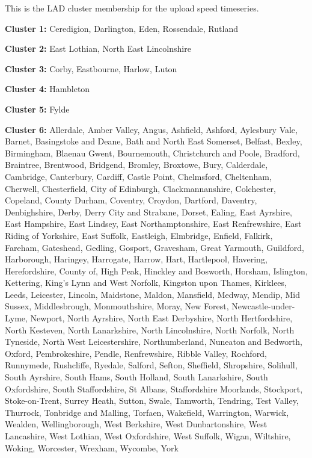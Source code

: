 \documentclass[Royal,times,sageh]{sagej}
\begin{document}
This is the LAD cluster membership for the upload speed timeseries.

\textbf{Cluster 1: } Ceredigion, Darlington, Eden, Rossendale, Rutland

\textbf{Cluster 2: } East Lothian, North East Lincolnshire

\textbf{Cluster 3: } Corby, Eastbourne, Harlow, Luton

\textbf{Cluster 4: } Hambleton

\textbf{Cluster 5: } Fylde

\textbf{Cluster 6: } Allerdale, Amber Valley, Angus, Ashfield, Ashford,
Aylesbury Vale, Barnet, Basingstoke and Deane, Bath and North East
Somerset, Belfast, Bexley, Birmingham, Blaenau Gwent, Bournemouth,
Christchurch and Poole, Bradford, Braintree, Brentwood, Bridgend,
Bromley, Broxtowe, Bury, Calderdale, Cambridge, Canterbury, Cardiff,
Castle Point, Chelmsford, Cheltenham, Cherwell, Chesterfield, City of
Edinburgh, Clackmannanshire, Colchester, Copeland, County Durham,
Coventry, Croydon, Dartford, Daventry, Denbighshire, Derby, Derry City
and Strabane, Dorset, Ealing, East Ayrshire, East Hampshire, East
Lindsey, East Northamptonshire, East Renfrewshire, East Riding of
Yorkshire, East Suffolk, Eastleigh, Elmbridge, Enfield, Falkirk,
Fareham, Gateshead, Gedling, Gosport, Gravesham, Great Yarmouth,
Guildford, Harborough, Haringey, Harrogate, Harrow, Hart, Hartlepool,
Havering, Herefordshire, County of, High Peak, Hinckley and Bosworth,
Horsham, Islington, Kettering, King's Lynn and West Norfolk, Kingston
upon Thames, Kirklees, Leeds, Leicester, Lincoln, Maidstone, Maldon,
Mansfield, Medway, Mendip, Mid Sussex, Middlesbrough, Monmouthshire,
Moray, New Forest, Newcastle-under-Lyme, Newport, North Ayrshire, North
East Derbyshire, North Hertfordshire, North Kesteven, North Lanarkshire,
North Lincolnshire, North Norfolk, North Tyneside, North West
Leicestershire, Northumberland, Nuneaton and Bedworth, Oxford,
Pembrokeshire, Pendle, Renfrewshire, Ribble Valley, Rochford, Runnymede,
Rushcliffe, Ryedale, Salford, Sefton, Sheffield, Shropshire, Solihull,
South Ayrshire, South Hams, South Holland, South Lanarkshire, South
Oxfordshire, South Staffordshire, St Albans, Staffordshire Moorlands,
Stockport, Stoke-on-Trent, Surrey Heath, Sutton, Swale, Tamworth,
Tendring, Test Valley, Thurrock, Tonbridge and Malling, Torfaen,
Wakefield, Warrington, Warwick, Wealden, Wellingborough, West Berkshire,
West Dunbartonshire, West Lancashire, West Lothian, West Oxfordshire,
West Suffolk, Wigan, Wiltshire, Woking, Worcester, Wrexham, Wycombe,
York
\end{document}
